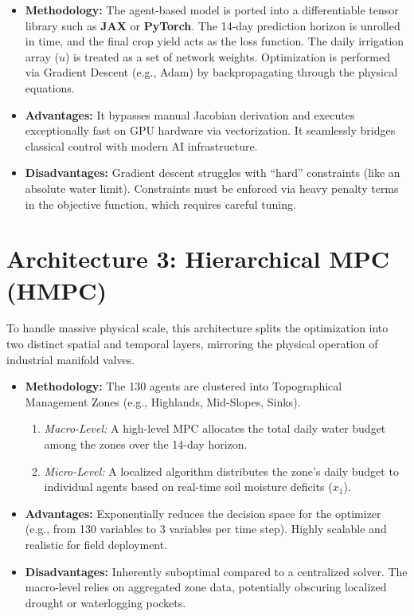 \documentclass[12pt, a4paper]{article}
\begin{document}
\begin{itemize}
    \item \textbf{Methodology:} The agent-based model is ported into a differentiable tensor library such as \textbf{JAX} or \textbf{PyTorch}. The 14-day prediction horizon is unrolled in time, and the final crop yield acts as the loss function. The daily irrigation array ($u$) is treated as a set of network weights. Optimization is performed via Gradient Descent (e.g., Adam) by backpropagating through the physical equations.
    \item \textbf{Advantages:} It bypasses manual Jacobian derivation and executes exceptionally fast on GPU hardware via vectorization. It seamlessly bridges classical control with modern AI infrastructure.
    \item \textbf{Disadvantages:} Gradient descent struggles with ``hard'' constraints (like an absolute water limit). Constraints must be enforced via heavy penalty terms in the objective function, which requires careful tuning.
\end{itemize}

\section{Architecture 3: Hierarchical MPC (HMPC)}
\label{sec:hmpc}
To handle massive physical scale, this architecture splits the optimization into two distinct spatial and temporal layers, mirroring the physical operation of industrial manifold valves.

\begin{itemize}
    \item \textbf{Methodology:} The 130 agents are clustered into Topographical Management Zones (e.g., Highlands, Mid-Slopes, Sinks). 
    \begin{enumerate}
        \item \textit{Macro-Level:} A high-level MPC allocates the total daily water budget among the zones over the 14-day horizon.
        \item \textit{Micro-Level:} A localized algorithm distributes the zone's daily budget to individual agents based on real-time soil moisture deficits ($x_1$).
    \end{enumerate}
    \item \textbf{Advantages:} Exponentially reduces the decision space for the optimizer (e.g., from 130 variables to 3 variables per time step). Highly scalable and realistic for field deployment.
    \item \textbf{Disadvantages:} Inherently suboptimal compared to a centralized solver. The macro-level relies on aggregated zone data, potentially obscuring localized drought or waterlogging pockets.
\end{itemize}
\end{document}
